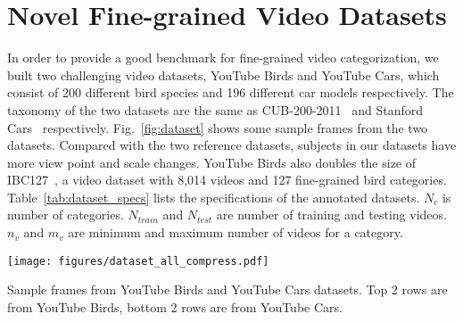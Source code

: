 \documentclass[runningheads]{llncs}
\begin{document}
 \section{Novel Fine-grained Video Datasets}

In order to provide a good benchmark for fine-grained video categorization, we built two challenging video datasets, YouTube Birds and YouTube Cars, which consist of 200 different bird species and 196 different car models respectively. The taxonomy of the two datasets are the same as CUB-200-2011~\cite{WahCUB_200_2011} and Stanford Cars~\cite{krause20133d} respectively. Fig.~\ref{fig:dataset} shows some sample frames from the two datasets.
Compared with the two reference datasets, subjects in our datasets have more view point and scale changes. YouTube Birds also doubles the size of IBC127~\cite{saito2016ibc127}, a video dataset with 8,014 videos and 127 fine-grained bird categories.
Table~\ref{tab:dataset_specs} lists the specifications of the annotated datasets. $N_c$ is number of categories. $N_{train}$ and $N_{test}$ are number of training and testing videos. $n_v$ and $m_v$ are minimum and maximum number of videos for a category.
\begin{table}[htbp]
\begin{minipage}[b]{0.65\linewidth}
\centering
\texttt{[image: figures/dataset\_all\_compress.pdf]}
\caption{Sample frames from YouTube Birds and YouTube Cars datasets. Top 2 rows are from YouTube Birds, bottom 2 rows are from YouTube Cars.}
\label{fig:dataset}
\end{minipage}
\begin{minipage}[b]{0.34\linewidth}
  \centering
  \caption{Specifications of YouTube Birds and YouTube Cars. }
  \label{tab:dataset_specs}
\end{minipage}
\end{table}
\end{document}
